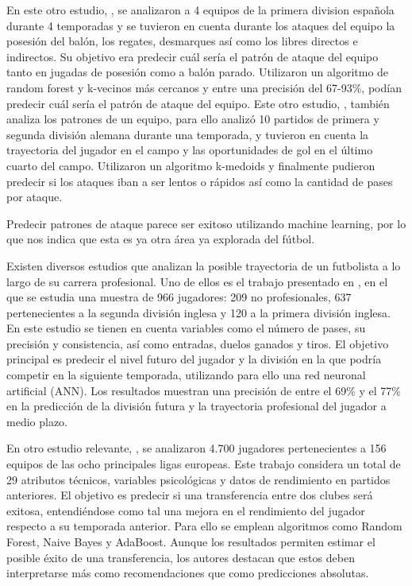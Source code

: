 En este otro estudio, \cite{second-other}, se analizaron a 4 equipos de la primera division española durante 4 temporadas y se tuvieron en cuenta durante los ataques del equipo la posesión del balón, los regates, desmarques así como los libres directos e indirectos. Su objetivo era predecir cuál sería el patrón de ataque del equipo tanto en jugadas de posesión como a balón parado. Utilizaron un algoritmo de random forest y k-vecinos más cercanos y entre una precisión del 67-93\%, podían predecir cuál sería el patrón de ataque del equipo. Este otro estudio, \cite{third-other}, también analiza los patrones de un equipo, para ello analizó 10 partidos de primera y segunda división alemana durante una temporada, y tuvieron en cuenta la trayectoria del jugador en el campo y las oportunidades de gol en el último cuarto del campo. Utilizaron un algoritmo k-medoids y finalmente pudieron predecir si los ataques iban a ser lentos o rápidos así como la cantidad de pases por ataque.

Predecir patrones de ataque parece ser exitoso utilizando machine learning, por lo que nos indica que esta es ya otra área ya explorada del fútbol.

Existen diversos estudios que analizan la posible trayectoria de un futbolista a lo largo de su carrera profesional. Uno de ellos es el trabajo presentado en \cite{first-career}, en el que se estudia una muestra de 966 jugadores: 209 no profesionales, 637 pertenecientes a la segunda división inglesa y 120 a la primera división inglesa. En este estudio se tienen en cuenta variables como el número de pases, su precisión y consistencia, así como entradas, duelos ganados y tiros. El objetivo principal es predecir el nivel futuro del jugador y la división en la que podría competir en la siguiente temporada, utilizando para ello una red neuronal artificial (ANN). Los resultados muestran una precisión de entre el 69\% y el 77\% en la predicción de la división futura y la trayectoria profesional del jugador a medio plazo.

En otro estudio relevante, \cite{second-career}, se analizaron 4.700 jugadores pertenecientes a 156 equipos de las ocho principales ligas europeas. Este trabajo considera un total de 29 atributos técnicos, variables psicológicas y datos de rendimiento en partidos anteriores. El objetivo es predecir si una transferencia entre dos clubes será exitosa, entendiéndose como tal una mejora en el rendimiento del jugador respecto a su temporada anterior. Para ello se emplean algoritmos como Random Forest, Naive Bayes y AdaBoost. Aunque los resultados permiten estimar el posible éxito de una transferencia, los autores destacan que estos deben interpretarse más como recomendaciones que como predicciones absolutas.

